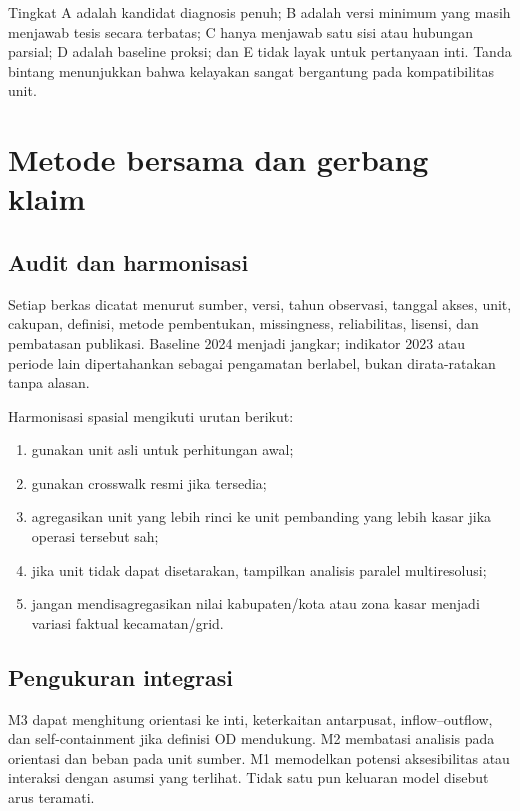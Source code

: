 \documentclass[10pt]{article}
\begin{document}
Tingkat A adalah kandidat diagnosis penuh; B adalah versi minimum yang masih menjawab tesis secara terbatas; C hanya menjawab satu sisi atau hubungan parsial; D adalah baseline proksi; dan E tidak layak untuk pertanyaan inti. Tanda bintang menunjukkan bahwa kelayakan sangat bergantung pada kompatibilitas unit.

\section{Metode bersama dan gerbang klaim}

\subsection{Audit dan harmonisasi}

Setiap berkas dicatat menurut sumber, versi, tahun observasi, tanggal akses, unit, cakupan, definisi, metode pembentukan, missingness, reliabilitas, lisensi, dan pembatasan publikasi. Baseline 2024 menjadi jangkar; indikator 2023 atau periode lain dipertahankan sebagai pengamatan berlabel, bukan dirata-ratakan tanpa alasan.

Harmonisasi spasial mengikuti urutan berikut:
\begin{enumerate}
  \item gunakan unit asli untuk perhitungan awal;
  \item gunakan crosswalk resmi jika tersedia;
  \item agregasikan unit yang lebih rinci ke unit pembanding yang lebih kasar jika operasi tersebut sah;
  \item jika unit tidak dapat disetarakan, tampilkan analisis paralel multiresolusi;
  \item jangan mendisagregasikan nilai kabupaten/kota atau zona kasar menjadi variasi faktual kecamatan/grid.
\end{enumerate}

\subsection{Pengukuran integrasi}

M3 dapat menghitung orientasi ke inti, keterkaitan antarpusat, inflow--outflow, dan self-containment jika definisi OD mendukung. M2 membatasi analisis pada orientasi dan beban pada unit sumber. M1 memodelkan potensi aksesibilitas atau interaksi dengan asumsi yang terlihat. Tidak satu pun keluaran model disebut arus teramati.
\end{document}
